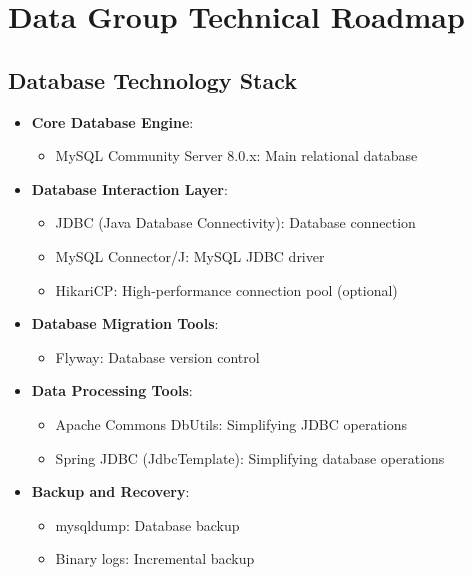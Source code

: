 \documentclass[a4paper,12pt]{article}
\begin{document}
\section{Data Group Technical Roadmap}

\subsection{Database Technology Stack}

\begin{itemize}
  \item \textbf{Core Database Engine}:
    \begin{itemize}
      \item MySQL Community Server 8.0.x: Main relational database
    \end{itemize}
  
  \item \textbf{Database Interaction Layer}:
    \begin{itemize}
      \item JDBC (Java Database Connectivity): Database connection
      \item MySQL Connector/J: MySQL JDBC driver
      \item HikariCP: High-performance connection pool (optional)
    \end{itemize}
  
  \item \textbf{Database Migration Tools}:
    \begin{itemize}
      \item Flyway: Database version control
    \end{itemize}
  
  \item \textbf{Data Processing Tools}:
    \begin{itemize}
      \item Apache Commons DbUtils: Simplifying JDBC operations
      \item Spring JDBC (JdbcTemplate): Simplifying database operations
    \end{itemize}
  
  \item \textbf{Backup and Recovery}:
    \begin{itemize}
      \item mysqldump: Database backup
      \item Binary logs: Incremental backup
    \end{itemize}
\end{itemize}
\end{document}
